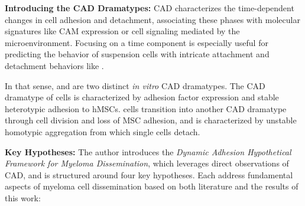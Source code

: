 \textbf{Introducing the CAD Dramatypes:}
\acf{CAD} characterizes the time-dependent changes in cell
adhesion and detachment, associating these phases with molecular signatures like
\ac{CAM} expression or cell signaling mediated by the microenvironment. Focusing
on a time component is especially useful for predicting the behavior of
suspension cells with intricate attachment and detachment behaviors like \INA.

In that sense, \MAina and \nMAina are two distinct \textit{in vitro} \ac{CAD}
dramatypes. The \ac{CAD} dramatype of \MAina cells is characterized by adhesion
factor expression and stable heterotypic adhesion to \acp{hMSC}. \MAina cells
transition into another \ac{CAD} dramatype \dashed{\nMAina} through cell
division and loss of MSC adhesion, and is characterized by unstable homotypic
aggregation from which single cells detach.


\textbf{Key Hypotheses:}
The author introduces the \emph{Dynamic Adhesion Hypothetical Framework for
    Myeloma Dissemination}, which leverages direct observations of
\ac{CAD}, and is structured around four key hypotheses. Each
address fundamental aspects of myeloma cell dissemination based on both
literature and the results of this work:



\newcommand{\caddadaptation}{ %
    \ac{CAD} changes dramatypes\footref{foot:caddt} in response to different environmental cues faced
    during dissemination %
}
\newcommand{\caddadaptationtitle}{ %
    \textit{Hypothesis 1}: \acl{CAD} (\acs{CAD}) is Adapted during Dissemination%
}%


\newcommand{\caddadaptibility}{ %
    Rapid of \ac{CAD} adaptability is a hallmark of aggressive myeloma %
}%
\newcommand{\caddadaptabilitytitle}{ %
    \textit{Hypothesis 2}: Rapid CAD Adaptability is a Hallmark of
    Aggressive Myeloma %
}%



\newcommand{\cadddiversity}{%
    \ac{CAD} is highly diverse within both patients and cell lines %
}%
\newcommand{\cadddiversitytitle}{ %
    \textit{Hypothesis 3}: CAD is Highly Diverse Within both Patients
    and Cell Lines%
}%


\newcommand{\caddtrigger}{%
    Detachment is caused by multiple cues of varying nature, including
    external mechanical forces, cell division, loss of \ac{CAM} expression, or
    even pure chance. }%
\newcommand{\caddtriggertitle}{ %
    \textit{Hypothesis 4}: Detachment is Caused by Multiple Cues of Varying
    Nature %
}%



